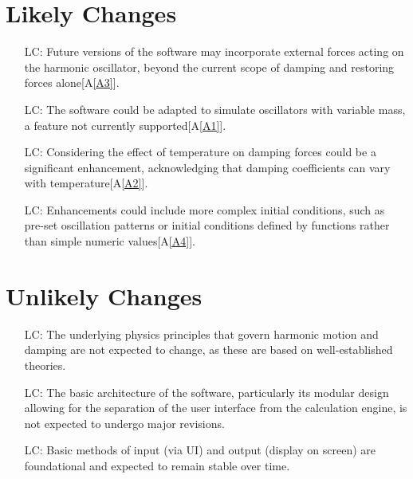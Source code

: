 \documentclass[12pt]{article}
\newcommand{\aref}[1]{A\ref{#1}}
\newcounter{lcnum} %
\begin{document}
\section{Likely Changes}    

\noindent \begin{itemize}

\item[LC\refstepcounter{lcnum}\thelcnum\label{LC_1}:] Future versions of the 
software may incorporate external forces acting on the harmonic oscillator, 
beyond the current scope of damping and restoring forces alone[\aref{A3}].
\item[LC\refstepcounter{lcnum}\thelcnum\label{LC_2}:] The software could be 
adapted to simulate oscillators with variable mass, a feature not currently 
supported[\aref{A1}].
\item[LC\refstepcounter{lcnum}\thelcnum\label{LC_3}:] Considering the effect 
of temperature on damping forces could be a significant enhancement, 
acknowledging that damping coefficients can vary with temperature[\aref{A2}].
\item[LC\refstepcounter{lcnum}\thelcnum\label{LC_4}:]  Enhancements could 
include more complex initial conditions, such as pre-set oscillation patterns 
or initial conditions defined by functions rather than simple numeric 
values[\aref{A4}].


\end{itemize}

\section{Unlikely Changes}    

\noindent \begin{itemize}

\item[LC\refstepcounter{lcnum}\thelcnum\label{ULC_1}:] The underlying 
physics principles that govern harmonic motion and damping are not expected to 
change, as these are based on well-established theories.

\item[LC\refstepcounter{lcnum}\thelcnum\label{ULC_2}:] The basic 
architecture of the software, particularly its modular design allowing for the 
separation of the user interface from the calculation engine, is not expected 
to undergo major revisions.

\item[LC\refstepcounter{lcnum}\thelcnum\label{ULC_3}:] Basic methods 
of input (via UI) and output (display on screen) are foundational and expected 
to remain stable over time.
\end{itemize}
\end{document}
